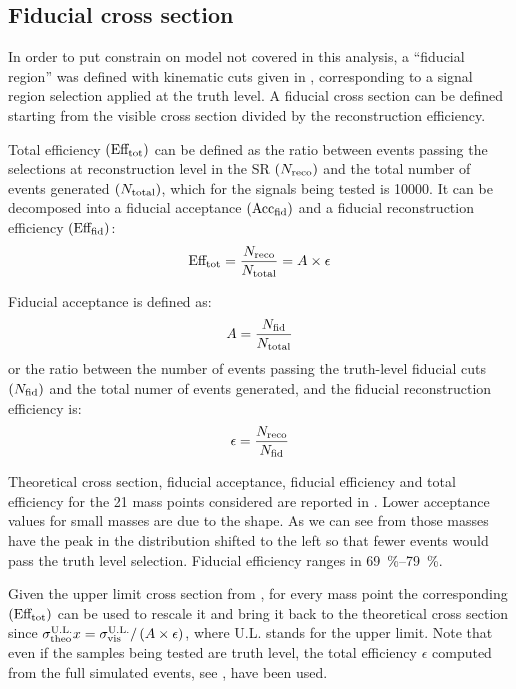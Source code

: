 

\subsection{Fiducial cross section}
In order to put constrain on model not covered in this analysis, a ``fiducial region'' was defined with kinematic cuts given in \Sect{\ref{sec:truth}}, corresponding to a signal region selection applied at the truth level. A fiducial cross section can be defined starting from the visible cross section divided by the reconstruction efficiency.

Total efficiency $\left(\text{Eff}_\textup{tot}\right)$ can be defined as the ratio between events passing the selections at reconstruction level in the SR $\left(N_\textup{reco}\right)$ and the total number of events generated $\left(N_\textup{total}\right)$, which for the signals being tested is \num{10000}. It can be decomposed into a fiducial acceptance $\left(\text{Acc}_\textup{fid}\right)$ and a fiducial reconstruction efficiency $\left(\text{Eff}_\textup{fid}\right)$:
\begin{equation}
	\text{Eff}_\textup{tot}=\frac{N_\textup{reco}}{N_\textup{total}}=A\times\epsilon
\end{equation}

Fiducial acceptance is defined as:
\begin{equation}
	A=\frac{N_\textup{fid}}{N_\textup{total}}
	\label{eqn:accfid}
\end{equation}
or the ratio between the number of events passing the truth-level fiducial cuts $\left(N_\textup{fid}\right)$ and the total numer of events generated, and the fiducial reconstruction efficiency is:
\begin{equation}
	\epsilon=\frac{N_\textup{reco}}{N_\textup{fid}}
	\label{eqn:efffid}
\end{equation}

Theoretical cross section, fiducial acceptance, fiducial efficiency and total efficiency for the \num{21} mass points considered are reported in \Tab{\ref{tab:eff}}. Lower acceptance values for small masses are due to the \met shape. As we can see from \Fig{\ref{fig:validation}} those masses have the peak in the \met distribution shifted to the left so that fewer events would pass the truth level selection. Fiducial efficiency ranges in \SIrange{69}{79}{\percent}.



Given the upper limit cross section from \Tab{\ref{table.results.exclxsec.pval.upperlimit.SR}}, for every mass point the corresponding $\left(\text{Eff}_\textup{tot}\right)$ can be used to rescale it and bring it back to the theoretical cross section since $\sigma_\textup{theo}^\textup{U.L.}x=\sigma_\textup{vis}^\textup{U.L.}/\left(A\times\epsilon\right)$, where U.L. stands for the \sv upper limit. Note that even if the samples being tested are truth level, the total efficiency $\epsilon$ computed from the full simulated events, see \Sect{\ref{sec:full}}, have been used.

